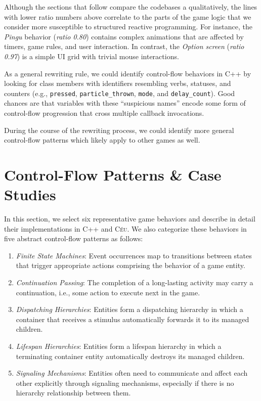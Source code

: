 \documentclass{vgtc}                          %
\newcommand{\CEU}{\textsc{C\'{e}u}\xspace}
\newcommand{\code}[1] {{\small{\texttt{#1}}}}
\begin{document}
Although the sections that follow compare the codebases a qualitatively, the
lines with lower ratio numbers above correlate to the parts of the game logic
that we consider more susceptible to structured reactive programming.
For instance, the \emph{Pingu} behavior (\emph{ratio 0.80}) contains complex
animations that are affected by timers, game rules, and user interaction.
In contrast, the \emph{Option screen} (\emph{ratio 0.97}) is a simple UI grid
with trivial mouse interactions.

As a general rewriting rule, we could identify control-flow behaviors in C++ by
looking for class members with identifiers resembling verbs, statuses, and
counters (e.g.,
\code{pressed},
\code{particle\_thrown},
\code{mode}, and
\code{delay\_count}).
Good chances are that variables with these ``suspicious names'' encode some
form of control-flow progression that cross multiple callback invocations.

During the course of the rewriting process, we could identify more general
control-flow patterns which likely apply to other games as well.

\section{Control-Flow Patterns \& Case Studies}
\label{sec.patterns}

In this section, we select six representative game behaviors and describe in
detail their implementations in C++ and \CEU.
%
We also categorize these behaviors in five abstract control-flow patterns as
follows:

\begin{enumerate}
\item \emph{Finite State Machines}:
    Event occurrences map to transitions between states that trigger
    appropriate actions comprising the behavior of a game entity.
\item \emph{Continuation Passing}:
    The completion of a long-lasting activity may carry a continuation, i.e.,
    some action to execute next in the game.
\item \emph{Dispatching Hierarchies}:
    Entities form a dispatching hierarchy in which a container that receives a
    stimulus automatically forwards it to its managed children.
\item \emph{Lifespan Hierarchies}:
    Entities form a lifespan hierarchy in which a terminating container entity
    automatically destroys its managed children.
\item \emph{Signaling Mechanisms}:
    Entities often need to communicate and affect each other explicitly through
    signaling mechanisms, especially if there is no hierarchy relationship
    between them.
\end{enumerate}
\end{document}
